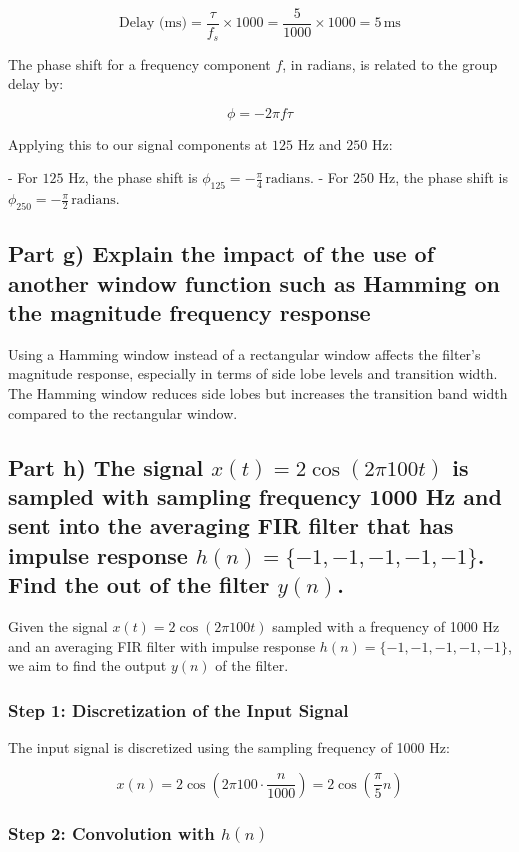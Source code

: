\documentclass{article}
\begin{document}
\[ \text{Delay (ms)} = \frac{\tau}{f_s} \times 1000 = \frac{5}{1000} \times 1000 = 5 \, \text{ms} \]

The phase shift for a frequency component \(f\), in radians, is related to the group delay by:

\[ \phi = -2\pi f \tau \]

Applying this to our signal components at \(125\) Hz and \(250\) Hz:

- For \(125\) Hz, the phase shift is \(\phi_{125} = -\frac{\pi}{4} \, \text{radians}\).
- For \(250\) Hz, the phase shift is \(\phi_{250} = -\frac{\pi}{2} \, \text{radians}\).

\subsection*{Part g) Explain the impact of the use of another window function such as Hamming on the magnitude
frequency response}

Using a Hamming window instead of a rectangular window affects the filter's magnitude response, especially in terms of side lobe levels and transition width. The Hamming window reduces side lobes but increases the transition band width compared to the rectangular window.

\subsection*{Part h) The signal \(x(t) = 2\cos(2\pi100t)\) is sampled with sampling frequency 1000 Hz and sent into
the averaging FIR filter that has impulse response \(h(n) = \{-1, -1, -1, -1, -1\}\). Find the
out of the filter \(y(n)\).
}
Given the signal \(x(t) = 2\cos(2\pi100t)\) sampled with a frequency of 1000 Hz and an averaging FIR filter with impulse response \(h(n) = \{-1, -1, -1, -1, -1\}\), we aim to find the output \(y(n)\) of the filter.

\subsubsection*{Step 1: Discretization of the Input Signal}

The input signal is discretized using the sampling frequency of 1000 Hz:

\[x(n) = 2\cos\left(2\pi100 \cdot \frac{n}{1000}\right) = 2\cos\left(\frac{\pi}{5}n\right)\]

\subsubsection*{Step 2: Convolution with \(h(n)\)}
\end{document}
